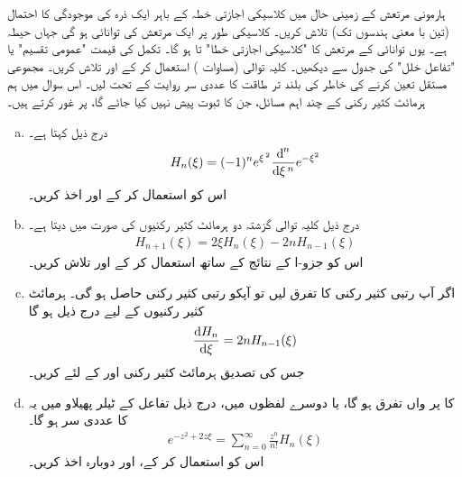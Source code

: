 ہارمونی مرتعش کے زمینی حال میں کلاسیکی اجازتی خطہ کے باہر ایک ذرہ کی موجودگی کا احتمال (تین با معنی ہندسوں تک) تلاش کریں۔
  کلاسیکی طور پر ایک مرتعش کی توانائی  ہو گی جہاں   حیطہ  ہے۔ یوں  توانائی  کے مرتعش کا "کلاسیکی اجازتی خطا"  تا  ہو گا۔ تکمل کی قیمت "عمومی تقسیم" یا "تفاعل خلل" کی جدول سے دیکھیں۔
%
کلیہ توالی (مساوات ) استعمال کر کے  اور 
تلاش کریں۔ مجموعی مستقل تعین کرنے کی خاطر   کی بلند تر طاقت کا عددی سر روایت کے تحت  لیں۔
%
اس سوال میں ہم ہرمائٹ کثیر رکنی کے چند اہم مسائل، جن کا ثبوت پیش نہیں کیا جائے گا، پر غور کرتے ہیں۔
\begin{enumerate}[a.]
\item
{}  درج ذیل کہتا ہے۔
\begin{align}
H_{n}(\xi)=(-1)^{n}e^{\xi^{\,2}}\frac{\dif^{\,n} }{\dif \xi^{\,n}}e^{-\xi^{2}}
\end{align}
اس کو استعمال کر کے  اور  اخذ کریں۔
\item
درج ذیل کلیہ توالی گزشتہ دو ہرمائٹ کثیر رکنیوں کی صورت میں  دیتا ہے۔
\begin{align}
H_{n+1}(\xi)=2\xi H_{n}(\xi)-2nH_{n-1}(\xi)
\end{align}
اس کو جزو-ا کے نتائج کے ساتھ استعمال کر کے  اور  تلاش کریں۔
\item
اگر آپ  رتبی کثیر رکنی کا تفرق لیں تو آپکو  رتبی کثیر رکنی حاصل ہو گی۔ ہرمائٹ کثیر رکنیوں کے لیے درج ذیل ہو گا
\begin{align}
\frac{\dif{H_{n}}}{\dif{\xi}}=2nH_{n-1}(\xi)
\end{align}
جس کی تصدیق ہرمائٹ کثیر رکنی  اور  کے لئے  کریں۔ 
\item
{}  کا  پر  واں تفرق  ہو گا، یا دوسرے لفظوں میں،  درج ذیل تفاعل کے ٹیلر پھیلاو میں یہ
 کا عددی سر ہو گا۔
\begin{align}
e^{-z^{2}+2z\xi}=\sum_{n=0}^{\infty}\frac{z^{n}}{n!}H_{n}(\xi)
\end{align}
اس کو  استعمال کر کے،   اور   دوبارہ اخذ کریں۔
\end{enumerate}

